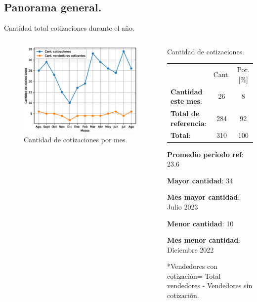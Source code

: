 \documentclass[aspectratio=169,xcolor=dvipsnames]{beamer}
\begin{document}
\subsection{Panorama general.}
\begin{frame}{Cantidad total cotizaciones durante el año.}


\begin{columns}[c]
    \begin{figure}
     \includegraphics[width=\textwidth]{EPS/cantidad_cotizaciones_mes.eps}
     \caption{Cantidad de cotizaciones por mes.}
     \label{cotizaciones_anual}
    \end{figure}
    
 \begin{block}{Cantidad de cotizaciones.}
 
\begin{tabular}{lcc}
                &Cant. &Por.[\%]\\
    \textbf{Cantidad este mes}: &26 &8\\
    \textbf{Total de referencia}: &284&92 \\\hline
     \textbf{Total}: &310& 100\\ 
\end{tabular}
\begin{itemize}
\footnotesize{
    \item \textbf{Promedio período ref}: 23.6
    \item \textbf{Mayor cantidad}: 34
    \item \textbf{Mes mayor cantidad}: Julio 2023
    \item \textbf{Menor cantidad}: 10
    \item \textbf{Mes menor cantidad}: Diciembre 2022}
\end{itemize}
 \tiny{*Vendedores con cotización= Total vendedores - Vendedores sin cotización.}
\end{block}


\end{columns}
\end{frame}
\end{document}
